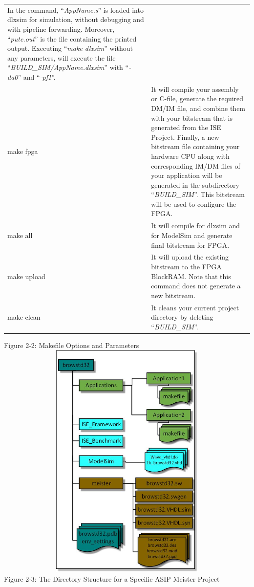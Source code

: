 \documentclass[
]{article}
\begin{document}
\begin{longtable}[]{@{}ll@{}}
\begin{minipage}[t]{0.47\columnwidth}
In the command, ``\emph{AppName.s}'' is loaded into dlxsim for
simulation, without debugging and with pipeline forwarding. Moreover,
``\emph{putc.out}'' is the file containing the printed output. Executing
``\emph{make dlxsim}'' without any parameters, will execute the file
``\emph{BUILD\_SIM/AppName.dlxsim}'' with ``\emph{-da0}'' and
``\emph{-pf1}''.\strut
\end{minipage}\tabularnewline
make fpga & It will compile your assembly or C-file, generate the
required DM/IM file, and combine them with your bitstream that is
generated from the ISE Project. Finally, a new bitstream file containing
your hardware CPU along with corresponding IM/DM files of your
application will be generated in the subdirectory ``\emph{BUILD\_SIM}''.
This bitstream will be used to configure the FPGA.\tabularnewline
make all & It will compile for dlxsim and for ModelSim and generate
final bitstream for FPGA.\tabularnewline
make upload & It will upload the existing bitstream to the FPGA
BlockRAM. Note that this command does not generate a new
bitstream.\tabularnewline
make clean & It cleans your current project directory by deleting
``\emph{BUILD\_SIM}''.\tabularnewline
\bottomrule
\end{longtable}

\protect\hypertarget{Fig22}{}{}Figure 2‑2: Makefile Options and
Parameters
\includegraphics[width=5.86597in,height=4.73125in]{2-3.png}
Figure 2‑3:\protect\hypertarget{Fig23}{}{} The Directory Structure for a
Specific ASIP Meister Project
\end{document}
